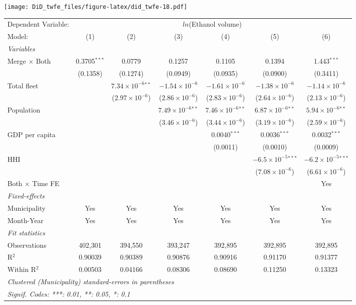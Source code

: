 \documentclass[
]{article}
\begin{document}
\texttt{[image: DiD\_twfe\_files/figure-latex/did\_twfe-18.pdf]}

\begin{tabular}{lcccccc}
\tabularnewline\midrule\midrule
Dependent Variable:&\multicolumn{6}{c}{$ln$(Ethanol volume)}\\
Model:&(1) & (2) & (3) & (4) & (5) & (6)\\
\midrule \emph{Variables}&   &   &   &   &   &  \\
Merge $\times $ Both & 0.3705$^{***}$ & 0.0779 & 0.1257 & 0.1105 & 0.1394 & 1.443$^{***}$\\
  &(0.1358) & (0.1274) & (0.0949) & (0.0935) & (0.0900) & (0.3411)\\
Total fleet &    & $7.34\times 10^{-6}$$^{**}$ & $-1.54\times 10^{-6}$ & $-1.61\times 10^{-6}$ & $-1.38\times 10^{-6}$ & $-1.14\times 10^{-6}$\\
  &   & ($2.97\times 10^{-6}$) & ($2.86\times 10^{-6}$) & ($2.83\times 10^{-6}$) & ($2.64\times 10^{-6}$) & ($2.13\times 10^{-6}$)\\
Population &    &    & $7.49\times 10^{-6}$$^{**}$ & $7.46\times 10^{-6}$$^{**}$ & $6.87\times 10^{-6}$$^{**}$ & $5.94\times 10^{-6}$$^{**}$\\
  &   &    & ($3.46\times 10^{-6}$) & ($3.44\times 10^{-6}$) & ($3.19\times 10^{-6}$) & ($2.59\times 10^{-6}$)\\
GDP per capita &    &    &    & 0.0040$^{***}$ & 0.0036$^{***}$ & 0.0032$^{***}$\\
  &   &    &    & (0.0011) & (0.0010) & (0.0009)\\
HHI &    &    &    &    & $-6.5\times 10^{-5}$$^{***}$ & $-6.2\times 10^{-5}$$^{***}$\\
  &   &    &    &    & ($7.08\times 10^{-6}$) & ($6.61\times 10^{-6}$)\\
Both $\times$ Time FE &  &  &  &  &  & Yes\\
\midrule \emph{Fixed-effects}&   &   &   &   &   &  \\
Municipality & Yes & Yes & Yes & Yes & Yes & Yes\\
Month-Year & Yes & Yes & Yes & Yes & Yes & Yes\\
\midrule \emph{Fit statistics}&  & & & & & \\
Observations & 402,301&394,550&393,247&392,895&392,895&392,895\\
R$^2$ & 0.90039&0.90389&0.90876&0.90916&0.91170&0.91377\\
Within R$^2$ & 0.00503&0.04166&0.08306&0.08690&0.11250&0.13323\\
\midrule\midrule\multicolumn{7}{l}{\emph{Clustered (Municipality) standard-errors in parentheses}}\\
\multicolumn{7}{l}{\emph{Signif. Codes: ***: 0.01, **: 0.05, *: 0.1}}\\
\end{tabular}
\end{document}
